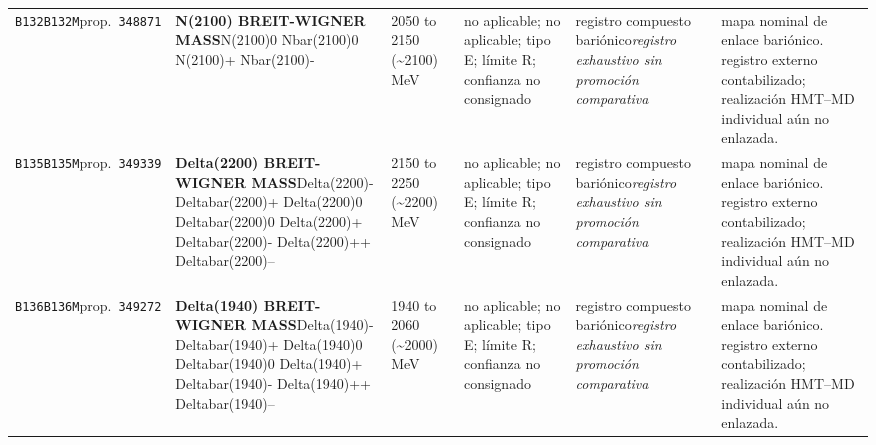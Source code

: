 \begin{landscape}
\begin{longtable}{L{1.85cm}L{4.45cm}L{2.35cm}L{4.05cm}L{3.35cm}L{7.15cm}}
\texttt{B132}\newline \texttt{B132M}\newline prop.\ \texttt{348871} & \textbf{N(2100) BREIT-WIGNER MASS}\newline N(2100)0 \textbar{}\allowbreak{} Nbar(2100)0 \textbar{}\allowbreak{} N(2100)+ \textbar{}\allowbreak{} Nbar(2100)- & 2050 to 2150 (\textasciitilde{}2100)\,MeV & no aplicable; no aplicable; tipo E; límite R; confianza no consignado & registro compuesto bariónico\newline \emph{registro exhaustivo sin promoción comparativa} & mapa nominal de enlace bariónico. registro externo contabilizado; realización HMT--MD individual aún no enlazada. \\
\texttt{B135}\newline \texttt{B135M}\newline prop.\ \texttt{349339} & \textbf{Delta(2200) BREIT-WIGNER MASS}\newline Delta(2200)- \textbar{}\allowbreak{} Deltabar(2200)+ \textbar{}\allowbreak{} Delta(2200)0 \textbar{}\allowbreak{} Deltabar(2200)0 \textbar{}\allowbreak{} Delta(2200)+ \textbar{}\allowbreak{} Deltabar(2200)- \textbar{}\allowbreak{} Delta(2200)++ \textbar{}\allowbreak{} Deltabar(2200)-- & 2150 to 2250 (\textasciitilde{}2200)\,MeV & no aplicable; no aplicable; tipo E; límite R; confianza no consignado & registro compuesto bariónico\newline \emph{registro exhaustivo sin promoción comparativa} & mapa nominal de enlace bariónico. registro externo contabilizado; realización HMT--MD individual aún no enlazada. \\
\texttt{B136}\newline \texttt{B136M}\newline prop.\ \texttt{349272} & \textbf{Delta(1940) BREIT-WIGNER MASS}\newline Delta(1940)- \textbar{}\allowbreak{} Deltabar(1940)+ \textbar{}\allowbreak{} Delta(1940)0 \textbar{}\allowbreak{} Deltabar(1940)0 \textbar{}\allowbreak{} Delta(1940)+ \textbar{}\allowbreak{} Deltabar(1940)- \textbar{}\allowbreak{} Delta(1940)++ \textbar{}\allowbreak{} Deltabar(1940)-- & 1940 to 2060 (\textasciitilde{}2000)\,MeV & no aplicable; no aplicable; tipo E; límite R; confianza no consignado & registro compuesto bariónico\newline \emph{registro exhaustivo sin promoción comparativa} & mapa nominal de enlace bariónico. registro externo contabilizado; realización HMT--MD individual aún no enlazada. \\

\end{longtable}
\end{landscape}
